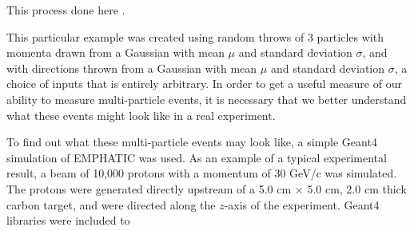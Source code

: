 This process done here .

This particular example was created using random throws of 3 particles with momenta drawn from a Gaussian with mean $\mu$ and standard deviation $\sigma$, and with directions thrown from a Gaussian with mean $\mu$ and standard deviation $\sigma$, a choice of inputs that is entirely arbitrary.
In order to get a useful measure of our ability to measure multi-particle events, it is necessary that we better understand what these events might look like in a real experiment.

To find out what these multi-particle events may look like, a simple Geant4 simulation of EMPHATIC was used.
As an example of a typical experimental result, a beam of 10,000 protons with a momentum of 30 GeV/c was simulated.
The protons were generated directly upstream of a 5.0 cm $\times$ 5.0 cm, 2.0 cm thick carbon target, and were directed along the $z$-axis of the experiment.
Geant4 libraries were included to 


\endinput

Any text after an \endinput is ignored.
You could put scraps here or things in progress.
